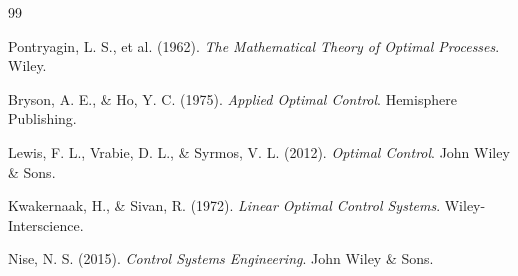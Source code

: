 \documentclass[12pt]{article}
\begin{document}
\begin{thebibliography}{99}

 Pontryagin, L. S., et al. (1962). \textit{The Mathematical Theory of Optimal Processes}. Wiley.

 Bryson, A. E., \& Ho, Y. C. (1975). \textit{Applied Optimal Control}. Hemisphere Publishing.

 Lewis, F. L., Vrabie, D. L., \& Syrmos, V. L. (2012). \textit{Optimal Control}. John Wiley \& Sons.

 Kwakernaak, H., \& Sivan, R. (1972). \textit{Linear Optimal Control Systems}. Wiley-Interscience.

 Nise, N. S. (2015). \textit{Control Systems Engineering}. John Wiley \& Sons.

\end{thebibliography}
\end{document}
